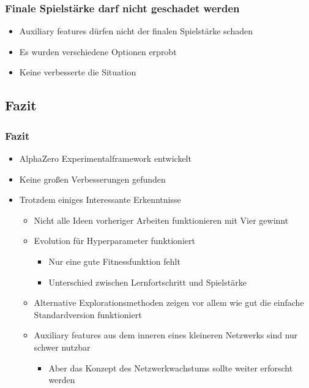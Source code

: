\begin{frame}
 \frametitle{Finale Spielstärke darf nicht geschadet werden}
  


\begin{itemize}
  \item \pause Auxiliary features dürfen nicht der finalen Spielstärke schaden
  \item \pause Es wurden verschiedene Optionen erprobt
  \item \pause Keine verbesserte die Situation
\end{itemize}

  
\end{frame}

\subsection{Fazit}



\begin{frame}
 \frametitle{Fazit}
  


\begin{itemize}
  \item \pause AlphaZero Experimentalframework entwickelt
  \item \pause Keine großen Verbesserungen gefunden
  \item \pause Trotzdem einiges Interessante Erkenntnisse
\begin{itemize}
  \item \pause Nicht alle Ideen vorheriger Arbeiten funktionieren mit Vier gewinnt
  \item \pause Evolution für Hyperparameter funktioniert
\begin{itemize}
  \item \pause Nur eine gute Fitnessfunktion fehlt
  \item \pause Unterschied zwischen Lernfortschritt und Spielstärke
\end{itemize}
  \item \pause Alternative Explorationsmethoden zeigen vor allem wie gut die einfache Standardversion funktioniert
  \item \pause Auxiliary features aus dem inneren eines kleineren Netzwerks sind nur schwer nutzbar
\begin{itemize}
  \item \pause Aber das Konzept des Netzwerkwachstums sollte weiter erforscht werden
\end{itemize}
\end{itemize}
\end{itemize}


  
\end{frame}

